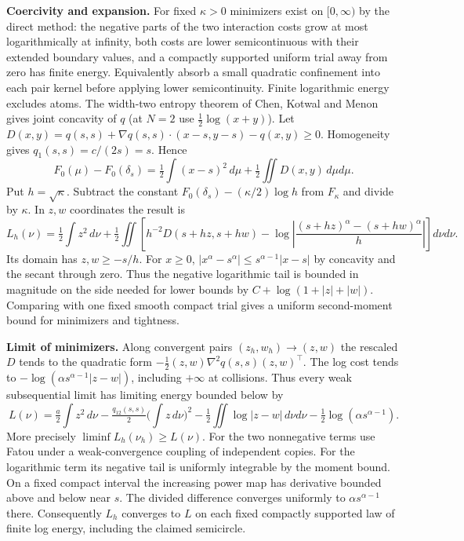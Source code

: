 \documentclass[10pt]{article}
\begin{document}
\textbf{Coercivity and expansion.} For fixed $\kappa>0$ minimizers exist on $[0,\infty)$ by the direct method: the negative parts of the two interaction costs grow at most logarithmically at infinity, both costs are lower semicontinuous with their extended boundary values, and a compactly supported uniform trial away from zero has finite energy. Equivalently absorb a small quadratic confinement into each pair kernel before applying lower semicontinuity. Finite logarithmic energy excludes atoms. The width-two entropy theorem of Chen, Kotwal and Menon gives joint concavity of $q$ (at $N=2$ use $\frac12\log(x+y)$). Let $D(x,y)=q(s,s)+\nabla q(s,s)\cdot(x-s,y-s)-q(x,y)\ge0$. Homogeneity gives $q_1(s,s)=c/(2s)=s$. Hence
\[
 F_0(\mu)-F_0(\delta_s)=\tfrac12\int(x-s)^2\,d\mu+\tfrac12\iint D(x,y)\,d\mu d\mu.
\]
Put $h=\sqrt\kappa$. Subtract the constant $F_0(\delta_s)-(\kappa/2)\log h$ from $F_\kappa$ and divide by $\kappa$. In $z,w$ coordinates the result is
\[
 L_h(\nu)=\tfrac12\int z^2\,d\nu+
 \tfrac12\iint\left[h^{-2}D(s+hz,s+hw)-\log\left|\frac{(s+hz)^\alpha-(s+hw)^\alpha}{h}\right|\right]d\nu d\nu .
\]
Its domain has $z,w\ge -s/h$. For $x\ge0$, $|x^\alpha-s^\alpha|\le s^{\alpha-1}|x-s|$ by concavity and the secant through zero. Thus the negative logarithmic tail is bounded in magnitude on the side needed for lower bounds by $C+\log(1+|z|+|w|)$. Comparing with one fixed smooth compact trial gives a uniform second-moment bound for minimizers and tightness.

\textbf{Limit of minimizers.} Along convergent pairs $(z_h,w_h)\to(z,w)$ the rescaled $D$ tends to the quadratic form $-\frac12(z,w)\nabla^2q(s,s)(z,w)^\top$. The log cost tends to $-\log(\alpha s^{\alpha-1}|z-w|)$, including $+\infty$ at collisions. Thus every weak subsequential limit has limiting energy bounded below by
\[
 L(\nu)=\tfrac a2\int z^2\,d\nu-\tfrac{q_{12}(s,s)}2\Big(\int z\,d\nu\Big)^2
   -\tfrac12\iint\log|z-w|\,d\nu d\nu-\tfrac12\log(\alpha s^{\alpha-1}).
\]
More precisely $\liminf L_h(\nu_h)\ge L(\nu)$. For the two nonnegative terms use Fatou under a weak-convergence coupling of independent copies. For the logarithmic term its negative tail is uniformly integrable by the moment bound. On a fixed compact interval the increasing power map has derivative bounded above and below near $s$. The divided difference converges uniformly to $\alpha s^{\alpha-1}$ there. Consequently $L_h$ converges to $L$ on each fixed compactly supported law of finite log energy, including the claimed semicircle.
\end{document}
